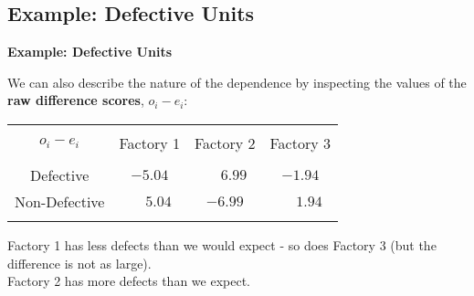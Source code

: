 \documentclass[compress]{beamer}        %
\makeatletter
\newcommand{\tcb}{\textcolor{beamer@blendedblue}}
\newcommand{\m}{\phantom{-}}
\makeatother
\begin{document}
\subsection{Example: Defective Units}
\begin{frame}{\bf \tcb{Example: Defective Units}}

We can also describe the nature of the dependence by inspecting the values of the {\bf raw difference scores}, $o_i - e_i$:\\[0.5cm]
\begin{center}
\begin{tabular}{|c|ccc|}
\hline
&&&\\[-0.3cm]
$o_i-e_i$      & Factory 1 & Factory 2 & Factory 3 \\[0.4cm]
\hline
&&&\\[-0.3cm]
Defective      &  $-5.04$ & $\m6.99$ &  $-1.94$ \\[0.2cm]
Non-Defective  & $\m5.04$ &  $-6.99$ & $\m1.94$ \\[0.1cm]
\hline
\multicolumn{4}{c}{}
\end{tabular}
\end{center}

Factory 1 has less defects than we would expect - so does Factory 3 (but the difference is not as large).\\[0.4cm]
Factory 2 has more defects than we expect.


\end{frame}
\end{document}

